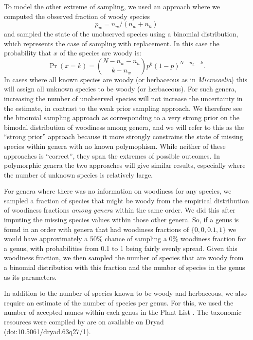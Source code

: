\documentclass[a4paper,12pt]{article}
\begin{document}
To model the other extreme of sampling, we used an approach where we
computed the observed fraction of woody species 
\[p_w = n_w / (n_w +n_h)\] 
and sampled the state of the unobserved species using a
binomial distribution, which represents the case of sampling
with replacement. In this case the probability that $x$ of the species
are woody is:
\begin{equation}
  \Pr(x = k) = {N - n_w - n_h \choose k - n_w} 
  p^k (1-p)^{N - n_h - k}.
\end{equation}
%
In cases where all known species are woody (or herbaceous as in
\textit{Microcoelia}) this will assign all unknown species to be woody
(or herbaceous). For such genera, increasing the number of unobserved
species will not increase the uncertainty in the estimate, in contrast
to the weak prior sampling approach.
%
We therefore see the binomial sampling approach as corresponding to a
very strong prior on the bimodal distribution of woodiness among
genera, and we will refer to this as the ``strong prior'' approach
because it more strongly constrains the state of missing species within genera with no known polymophism.
While neither of these approaches is ``correct'', they %
span
the extremes of possible outcomes.
%
In polymorphic genera the two approaches will give similar results,
especially where the number of unknown species is relatively large.

For genera where there was no information on woodiness for any
species, we sampled a fraction of species that might be woody from
the empirical distribution of woodiness fractions \textit{among
  genera} within the same order. We did this after imputing the
missing species values within those other genera. So, if a genus is
found in an order with genera that had woodiness fractions of $\{0, 0,
0.1, 1\}$ we would have approximately a 50\% chance of sampling a 0\%
woodiness fraction for a genus, with probabilities from 0.1 to 1 being
fairly evenly spread.  Given this woodiness fraction, we then sampled
the number of species that are woody from a binomial distribution with
this fraction and the number of species in the genus as its
parameters.

In addition to the number of species known to be woody and herbaceous,
we also require an estimate of the number of species per genus.  For this, we
used the number of accepted names within each genus in the Plant List
\citep{ThePlantList}. The taxonomic resources were compiled by \citet{Zanne}
are on available on Dryad (doi:10.5061/dryad.63q27/1). 
\end{document}
